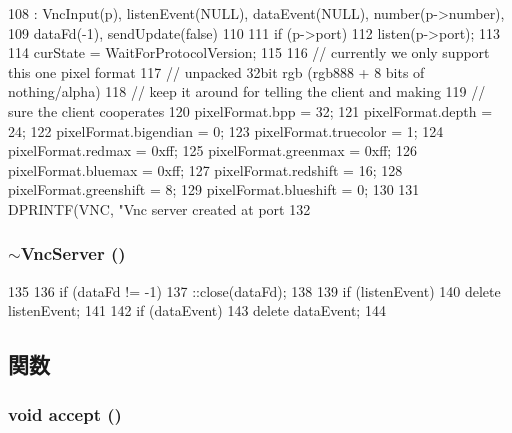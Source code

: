 \begin{DoxyCode}
108     : VncInput(p), listenEvent(NULL), dataEvent(NULL), number(p->number),
109       dataFd(-1), sendUpdate(false)
110 {
111     if (p->port)
112         listen(p->port);
113 
114     curState = WaitForProtocolVersion;
115 
116     // currently we only support this one pixel format
117     // unpacked 32bit rgb (rgb888 + 8 bits of nothing/alpha)
118     // keep it around for telling the client and making
119     // sure the client cooperates
120     pixelFormat.bpp = 32;
121     pixelFormat.depth = 24;
122     pixelFormat.bigendian = 0;
123     pixelFormat.truecolor = 1;
124     pixelFormat.redmax = 0xff;
125     pixelFormat.greenmax = 0xff;
126     pixelFormat.bluemax = 0xff;
127     pixelFormat.redshift = 16;
128     pixelFormat.greenshift = 8;
129     pixelFormat.blueshift = 0;
130 
131     DPRINTF(VNC, "Vnc server created at port %
132 }
\end{DoxyCode}
\hypertarget{classVncServer_a13ae0e928ec930d77353cb1bd42e36a1}{
\subsubsection[{$\sim$VncServer}]{\setlength{\rightskip}{0pt plus 5cm}$\sim${\bf VncServer} ()}}
\label{classVncServer_a13ae0e928ec930d77353cb1bd42e36a1}



\begin{DoxyCode}
135 {
136     if (dataFd != -1)
137         ::close(dataFd);
138 
139     if (listenEvent)
140         delete listenEvent;
141 
142     if (dataEvent)
143         delete dataEvent;
144 }
\end{DoxyCode}


\subsection{関数}
\hypertarget{classVncServer_aadb9f3b844fb4cf98288cd3c60a3af91}{
\subsubsection[{accept}]{\setlength{\rightskip}{0pt plus 5cm}void accept ()}}
\label{classVncServer_aadb9f3b844fb4cf98288cd3c60a3af91}



